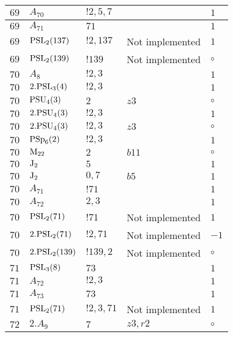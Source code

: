 \documentclass[a4paper, 11pt]{article}
\begin{document}
\begin{longtable}{lllll}
        $ 69 $ & $ A_{70} $ & $ !2, 5, 7 $ & $ ~ $ & $ 1$ \\ \hline
        $ 69 $ & $ A_{71} $ & $ 71 $ & $ ~ $ & $ 1$ \\ \hline
        $ 69 $ & $ {\rm PSL}_{2}(137) $ & $ !2, 137 $ &  Not implemented & $ 1$ \\ \hline
        $ 69 $ & $ {\rm PSL}_{2}(139) $ & $ !139 $ &  Not implemented &  $\circ$ \\ \hline
        $ 70 $ & $ A_{8} $ & $ ! 2,3 $ & $ ~ $ & $ 1$ \\ \hline
        $ 70 $ & $ 2.{\rm PSL}_{3}(4) $ & $ ! 2,3 $ & $ ~ $ & $ 1$ \\ \hline
        $ 70 $ & $ {\rm PSU}_{4}(3) $ & $ 2 $ & $ z3 $ &  $\circ$ \\ \hline
        $ 70 $ & $ 2.{\rm PSU}_{4}(3) $ & $ ! 2,3 $ & $ ~ $ & $ 1$ \\ \hline
        $ 70 $ & $ 2.{\rm PSU}_{4}(3) $ & $ ! 2,3 $ & $ z3 $ &  $\circ$ \\ \hline
        $ 70 $ & $ {\rm PSp}_{6}(2) $ & $ ! 2,3 $ & $ ~ $ & $ 1$ \\ \hline
        $ 70 $ & $ {\rm M}_{22} $ & $ 2 $ & $ b11 $ &  $\circ$ \\ \hline
        $ 70 $ & $ {\rm J}_2 $ & $ 5 $ & $ ~ $ & $ 1$ \\ \hline
        $ 70 $ & $ {\rm J}_2 $ & $ 0,7 $ & $ b5 $ & $ 1$ \\ \hline
        $ 70 $ & $ A_{71} $ & $ !71 $ & $ ~ $ & $ 1$ \\ \hline
        $ 70 $ & $ A_{72} $ & $ 2, 3 $ & $ ~ $ & $ 1$ \\ \hline
        $ 70 $ & $ {\rm PSL}_{2}(71) $ & $ !71 $ &  Not implemented & $ 1$ \\ \hline
        $ 70 $ & $ 2.{\rm PSL}_{2}(71) $ & $ !2, 71 $ &  Not implemented & $ -1$ \\ \hline
        $ 70 $ & $ 2.{\rm PSL}_{2}(139) $ & $ !139, 2 $ &  Not implemented &  $\circ$ \\ \hline
        $ 71 $ & $ {\rm PSL}_{3}(8) $ & $ 73 $ & $ ~ $ & $ 1$ \\ \hline
        $ 71 $ & $ A_{72} $ & $ !2, 3 $ & $ ~ $ & $ 1$ \\ \hline
        $ 71 $ & $ A_{73} $ & $ 73 $ & $ ~ $ & $ 1$ \\ \hline
        $ 71 $ & $ {\rm PSL}_{2}(71) $ & $ !2, 3, 71 $ &  Not implemented & $ 1$ \\ \hline
        $ 72 $ & $ 2.A_{9} $ & $ 7 $ & $ z3, r2 $ &  $\circ$ \\ \hline

\end{longtable}
\end{document}
